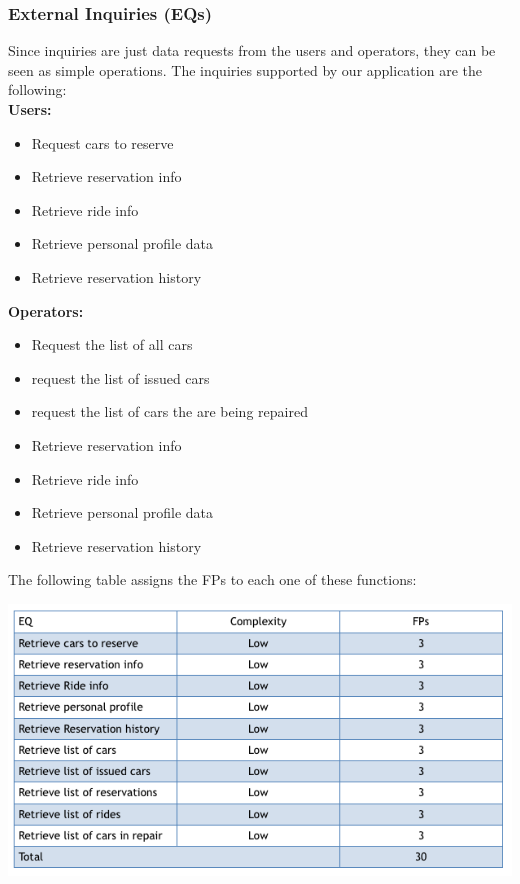 \documentclass{article}
\begin{document}
\begin{flushleft}
\newpage
\subsubsection{External Inquiries (EQs)} %
Since inquiries are just data requests from the users and operators, they can be seen as simple operations. The inquiries supported by our application are the following:\\
\vspace{0.5cm}
\textbf{Users:}

\begin{itemize}
\item Request cars to reserve
\item Retrieve reservation info
\item Retrieve ride info
\item Retrieve personal profile data
\item Retrieve reservation history
\end{itemize} 




\textbf{Operators:}
\begin{itemize}
\item Request the list of all cars 
\item request the list of issued cars
\item request the list of cars the are being repaired 
\item Retrieve reservation info
\item Retrieve ride info
\item Retrieve personal profile data
\item Retrieve reservation history
\end{itemize} 

The following table assigns the FPs to each one of these functions:

\includegraphics[scale=0.5]{EQ}



\end{flushleft}
\end{document}
